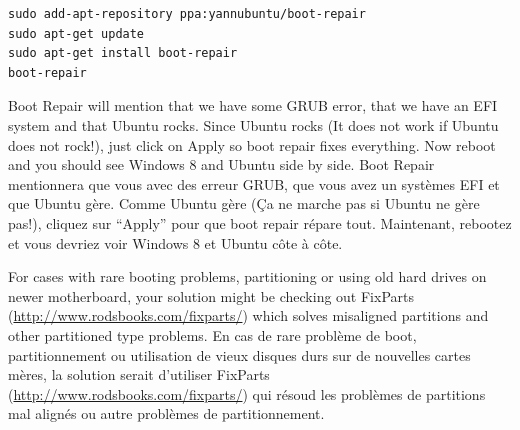 \documentclass[fr]{../guide}
\begin{document}
\begin{verbatim}
sudo add-apt-repository ppa:yannubuntu/boot-repair
sudo apt-get update
sudo apt-get install boot-repair
boot-repair
\end{verbatim}

{Boot Repair will mention that we have some GRUB error, that we have an EFI system and that Ubuntu rocks. Since Ubuntu rocks (It does not work if Ubuntu does not rock!), just click on Apply so boot repair fixes everything. Now reboot and you should see Windows 8 and Ubuntu side by side.}
{Boot Repair mentionnera que vous avec des erreur GRUB, que vous avez un systèmes EFI et que Ubuntu gère.
Comme Ubuntu gère (Ça ne marche pas si Ubuntu ne gère pas!), cliquez sur ``Apply'' pour que boot repair répare tout.
Maintenant, rebootez et vous devriez voir Windows 8 et Ubuntu côte à côte.}

{For cases with rare booting problems, partitioning or using old hard drives on newer motherboard, your solution might be checking out FixParts (\url{http://www.rodsbooks.com/fixparts/}) which solves misaligned partitions and other partitioned type problems.}
{En cas de rare problème de boot, partitionnement ou utilisation de vieux disques durs sur de nouvelles cartes mères,
la solution serait d'utiliser FixParts (\url{http://www.rodsbooks.com/fixparts/}) qui résoud les problèmes de partitions mal alignés ou autre problèmes de partitionnement.}
\end{document}
